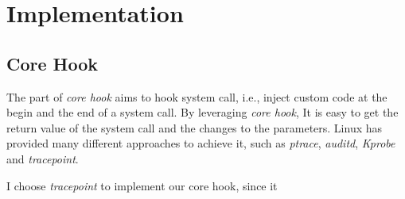 \section{Implementation}
\subsection{Core Hook}

The part of \textit{core hook} aims to hook system call, i.e., inject custom code at the begin and the end of a system call. By leveraging \textit{core hook}, It is easy to get the return value of the system call and the changes to the parameters. Linux has provided many different approaches to achieve it, such as \textit{ptrace}, \textit{auditd}, \textit{Kprobe} and \textit{tracepoint}. 

I choose \textit{tracepoint} to implement our core hook, since it 










